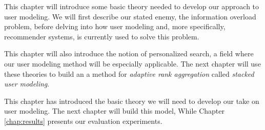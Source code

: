 \label{chap:theory}

This chapter will introduce some basic theory needed to develop our approach to user modeling.
We will first describe our stated enemy, the information overload problem, before delving into
how user modeling and, more specifically, recommender systems, is currently used to solve this problem.

This chapter will also introduce the notion of personalized search, a field where
our user modeling method will be especially applicable.
The next chapter will use these theories to build an 
a method for \emph{adaptive rank aggregation}
called \emph{stacked user modeling}.






 
\hr

This chapter has introduced the basic theory we will need to develop our take on user modeling.
The next chapter will build this model,
While Chapter \ref{chap:results} presents our evaluation experiments.


